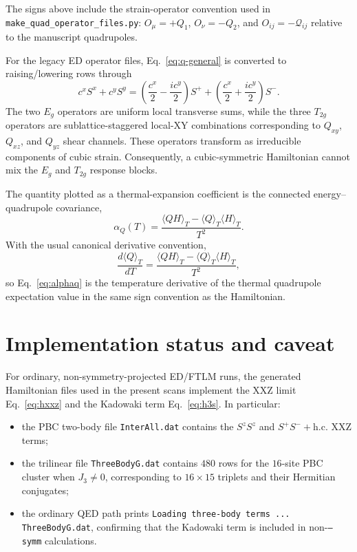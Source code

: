 \documentclass[11pt]{article}
\begin{document}
The signs above include the strain-operator convention used in
\texttt{make\_quad\_operator\_files.py}: $O_\mu=+Q_1$, $O_\nu=-Q_2$, and
$O_{ij}=-\mathcal Q_{ij}$ relative to the manuscript quadrupoles.

For the legacy ED operator files, Eq.~\eqref{eq:q-general} is converted to
raising/lowering rows through
\begin{equation}
  c^x S^x + c^y S^y
  =
  \left(\frac{c^x}{2}-\frac{i c^y}{2}\right)S^+
  +
  \left(\frac{c^x}{2}+\frac{i c^y}{2}\right)S^- .
\end{equation}
The two $E_g$ operators are uniform local transverse sums, while the three
$T_{2g}$ operators are sublattice-staggered local-XY combinations
corresponding to $Q_{xy}$, $Q_{xz}$, and $Q_{yz}$ shear channels.  These
operators transform as irreducible components of cubic strain.  Consequently,
a cubic-symmetric Hamiltonian cannot mix the $E_g$ and $T_{2g}$ response
blocks.

The quantity plotted as a thermal-expansion coefficient is the connected
energy--quadrupole covariance,
\begin{equation}
  \alpha_Q(T)
  =
  \frac{\langle QH\rangle_T-\langle Q\rangle_T\langle H\rangle_T}{T^2}.
  \label{eq:alphaq}
\end{equation}
With the usual canonical derivative convention,
\begin{equation}
  \frac{d\langle Q\rangle_T}{dT}
  =
  \frac{\langle QH\rangle_T-\langle Q\rangle_T\langle H\rangle_T}{T^2},
\end{equation}
so Eq.~\eqref{eq:alphaq} is the temperature derivative of the thermal
quadrupole expectation value in the same sign convention as the Hamiltonian.

\section{Implementation status and caveat}

For ordinary, non-symmetry-projected ED/FTLM runs, the generated Hamiltonian
files used in the present scans implement the XXZ limit
Eq.~\eqref{eq:hxxz} and the Kadowaki term Eq.~\eqref{eq:h3s}.  In particular:
\begin{itemize}
  \item the PBC two-body file \texttt{InterAll.dat} contains the $S^zS^z$ and
        $S^+S^-+\mathrm{h.c.}$ XXZ terms;
  \item the trilinear file \texttt{ThreeBodyG.dat} contains $480$ rows for the
        $16$-site PBC cluster when $J_3\neq0$, corresponding to
        $16\times15$ triplets and their Hermitian conjugates;
  \item the ordinary QED path prints
        \texttt{Loading three-body terms ... ThreeBodyG.dat}, confirming that
        the Kadowaki term is included in non-\texttt{--symm} calculations.
\end{itemize}
\end{document}
